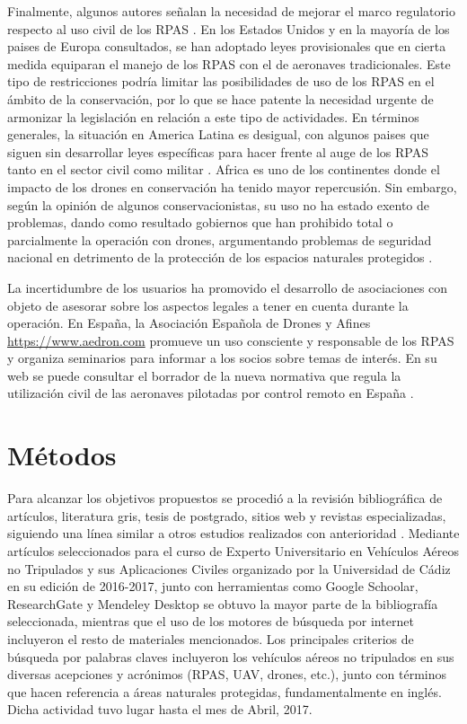\documentclass[11pt,]{article}
\begin{document}
Finalmente, algunos autores señalan la necesidad de mejorar el marco
regulatorio respecto al uso civil de los RPAS \citep{Nugraha2016}. En
los Estados Unidos y en la mayoría de los paises de Europa consultados,
se han adoptado leyes provisionales que en cierta medida equiparan el
manejo de los RPAS con el de aeronaves tradicionales. Este tipo de
restricciones podría limitar las posibilidades de uso de los RPAS en el
ámbito de la conservación, por lo que se hace patente la necesidad
urgente de armonizar la legislación en relación a este tipo de
actividades. En términos generales, la situación en America Latina es
desigual, con algunos paises que siguen sin desarrollar leyes
específicas para hacer frente al auge de los RPAS tanto en el sector
civil como militar \citep{Nacion2013}. Africa es uno de los continentes
donde el impacto de los drones en conservación ha tenido mayor
repercusión. Sin embargo, según la opinión de algunos conservacionistas,
su uso no ha estado exento de problemas, dando como resultado gobiernos
que han prohibido total o parcialmente la operación con drones,
argumentando problemas de seguridad nacional en detrimento de la
protección de los espacios naturales protegidos \citep{Andrews2014}.

La incertidumbre de los usuarios ha promovido el desarrollo de
asociaciones con objeto de asesorar sobre los aspectos legales a tener
en cuenta durante la operación. En España, la Asociación Española de
Drones y Afines \url{https://www.aedron.com} promueve un uso consciente
y responsable de los RPAS y organiza seminarios para informar a los
socios sobre temas de interés. En su web se puede consultar el borrador
de la nueva normativa que regula la utilización civil de las aeronaves
pilotadas por control remoto en España \citep{Aedron2017}.

\section{Métodos}\label{metodos}

Para alcanzar los objetivos propuestos se procedió a la revisión
bibliográfica de artículos, literatura gris, tesis de postgrado, sitios
web y revistas especializadas, siguiendo una línea similar a otros
estudios realizados con anterioridad \citet{Linchant2015}. Mediante
artículos seleccionados para el curso de Experto Universitario en
Vehículos Aéreos no Tripulados y sus Aplicaciones Civiles organizado por
la Universidad de Cádiz en su edición de 2016-2017, junto con
herramientas como Google Schoolar, ResearchGate y Mendeley Desktop se
obtuvo la mayor parte de la bibliografía seleccionada, mientras que el
uso de los motores de búsqueda por internet incluyeron el resto de
materiales mencionados. Los principales criterios de búsqueda por
palabras claves incluyeron los vehículos aéreos no tripulados en sus
diversas acepciones y acrónimos (RPAS, UAV, drones, etc.), junto con
términos que hacen referencia a áreas naturales protegidas,
fundamentalmente en inglés. Dicha actividad tuvo lugar hasta el mes de
Abril, 2017.
\end{document}
